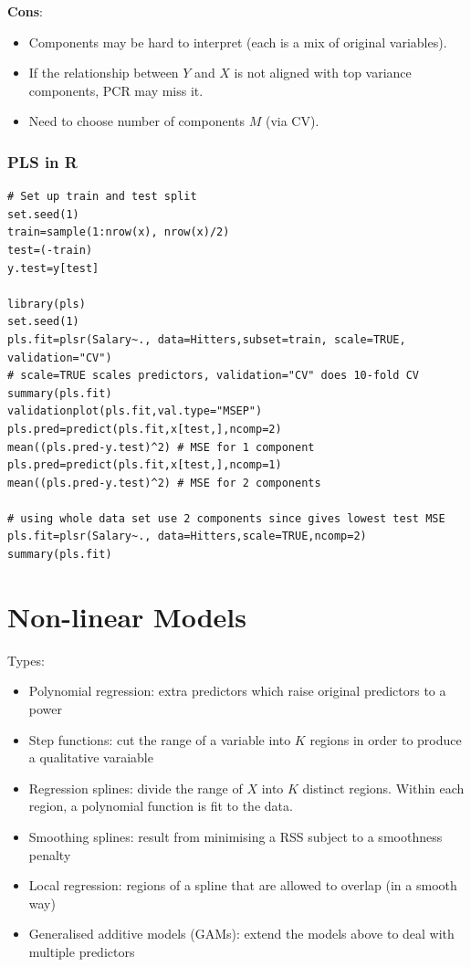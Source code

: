 \documentclass[11pt]{article}
\begin{document}
\noindent \textbf{Cons}:
\begin{itemize}
    \item Components may be hard to interpret (each is a mix of original variables).
    \item If the relationship between $Y$ and $X$ is not aligned with top variance components, PCR may miss it.
    \item Need to choose number of components $M$ (via CV).
\end{itemize}

\subsubsection{PLS in R}
\begin{lstlisting}
# Set up train and test split
set.seed(1)
train=sample(1:nrow(x), nrow(x)/2)
test=(-train)
y.test=y[test]

library(pls)
set.seed(1)
pls.fit=plsr(Salary~., data=Hitters,subset=train, scale=TRUE, validation="CV")
# scale=TRUE scales predictors, validation="CV" does 10-fold CV
summary(pls.fit)
validationplot(pls.fit,val.type="MSEP")
pls.pred=predict(pls.fit,x[test,],ncomp=2)
mean((pls.pred-y.test)^2) # MSE for 1 component
pls.pred=predict(pls.fit,x[test,],ncomp=1)
mean((pls.pred-y.test)^2) # MSE for 2 components

# using whole data set use 2 components since gives lowest test MSE
pls.fit=plsr(Salary~., data=Hitters,scale=TRUE,ncomp=2)
summary(pls.fit)
\end{lstlisting}

\newpage
\section{Non-linear Models}
\noindent Types:
\begin{itemize}
    \item Polynomial regression: extra predictors which raise original predictors to a power
    \item Step functions: cut the range of a variable into $K$ regions in order to produce a qualitative varaiable
    \item Regression splines: divide the range of $X$ into $K$ distinct regions. Within each region, a polynomial function is fit to the data.
    \item Smoothing splines: result from minimising a RSS subject to a smoothness penalty
    \item Local regression: regions of a spline that are allowed to overlap (in a smooth way)
    \item Generalised additive models (GAMs): extend the models above to deal with multiple predictors
\end{itemize}
\end{document}
